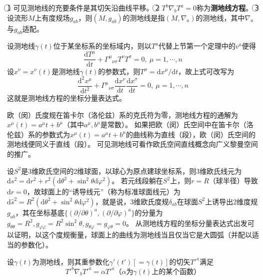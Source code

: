 \begin{note}
\textcircled{1} 可见测地线的充要条件是其切矢沿曲线平移。
\textcircled{2} $T^b\nabla_bT^a = 0$称为\textbf{测地线方程}。
\textcircled{3} 设流形$M$上有度规场$g_{ab}$，则$(M, g_{ab})$的测地线是指$(M, \nabla_a)$的测地线，其中$\nabla_a$与$g_{ab}$适配。
\end{note}

设测地线$\gamma(t)$位于某坐标系的坐标域内，则以$T^a$代替上节第一个定理中的$v^a$便得
$$\frac{\mathrm{d}T^\mu}{\mathrm{d}t} + \Gamma^\mu{}_{\nu\sigma}T^\nu T^\sigma = 0, ~ \mu = 1, \cdots, n$$
设$x^\nu = x^\nu(t)$是测地线$\gamma(t)$的参数式，则$T^\mu = \mathrm{d}x^\mu / \mathrm{d}t$，故上式可改写为
$$\frac{\mathrm{d}^2x^\mu}{\mathrm{d}t^2} + \Gamma^\mu{}_{\nu\sigma}\frac{\mathrm{d}x^\nu}{\mathrm{d}t}\frac{\mathrm{d}x^\sigma}{\mathrm{d}t} = 0, ~ \mu = 1, \cdots, n$$
这就是测地线方程的坐标分量表达式。

\begin{example}
欧（闵）氏度规在笛卡尔（洛伦兹）系的克氏符为零，测地线方程的通解为$x^\mu(t) = a^\mu t + b^\mu$（其中$a^\mu, b^\mu$是常数）。
如果把欧（闵）氏空间中在笛卡尔（洛伦兹）系的参数式为$x^\mu(t) = a^\mu t + b^\mu$的曲线称为直线（段），欧（闵）氏空间的测地线便同义于直线（段）。
可见测地线可看作欧氏空间直线概念向广义黎曼空间的推广。
\end{example}

\begin{example}
设$S^2$是$3$维欧氏空间的$2$维球面，以球心为原点建球坐标系，则$3$维欧氏线元为$\mathrm{d}s^2 = \mathrm{d}r^2 + r^2(\mathrm{d}\theta^2 + \sin^2\theta\mathrm{d}\varphi^2)$。
若元线段躺在$S^2$上，则$r = R$（球半径）导致$\mathrm{d}r = 0$，故球面上的``诱导线元''（称为标准球面线元）为$\mathrm{d}\hat{s}^2 = R^2(\mathrm{d}\theta^2 + \sin^2\theta\mathrm{d}\varphi^2)$，就是说，$3$维欧氏度规$\delta_{ab}$在球面$S^2$上诱导出$2$维度规$g_{ab}$，其在坐标基底$\{(\partial / \partial\theta)^a, (\partial / \partial\varphi)^a\}$的分量为$g_{\theta\theta} = R^2, g_{\varphi\varphi} = R^2\sin^2\theta, g_{\theta\varphi} = g_{\varphi\theta} = 0$。
从测地线方程的坐标分量表达式出发可以证明，以这个度规衡量，球面上的曲线为测地线当且仅当它是大圆弧（并配以适当的参数化）。
\end{example}

\begin{theorem}
设$\gamma(t)$为测地线，则其重参数化$\gamma'(t')[= \gamma(t)]$的切矢$T'^a$满足
$$T'^b\nabla_bT'^a = \alpha T'^a\text{（$\alpha$为$\gamma(t)$上的某个函数）}$$
\end{theorem}

